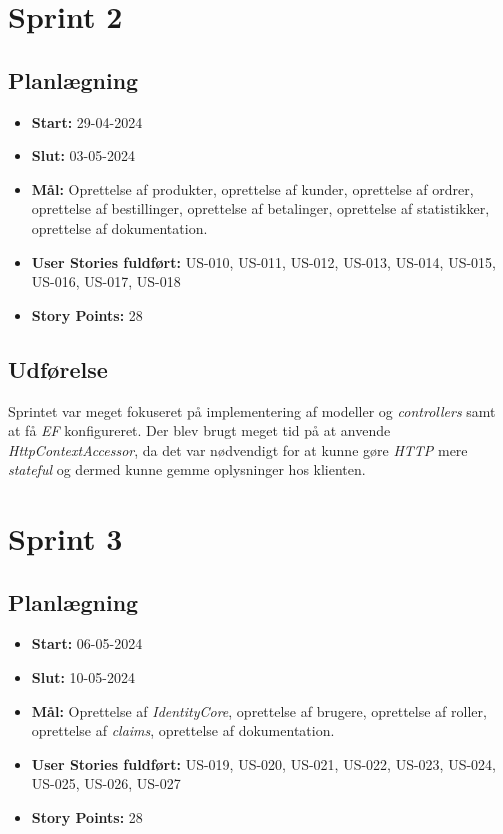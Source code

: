 \section{Sprint 2}
\label{sec:sprint-2}
\subsection{Planlægning}
\label{subsec:sprint-2-plan}
\begin{itemize}
    \item \textbf{Start:} 29-04-2024
    \item \textbf{Slut:} 03-05-2024
    \item \textbf{Mål:} Oprettelse af produkter, oprettelse af kunder, oprettelse af ordrer, oprettelse af bestillinger, oprettelse af betalinger, oprettelse af statistikker, oprettelse af dokumentation.
    \item \textbf{User Stories fuldført:} US-010, US-011, US-012, US-013, US-014, US-015, US-016, US-017, US-018
    \item \textbf{Story Points:} 28
\end{itemize}

\subsection{Udførelse}
\label{subsec:sprint-2-udforelse}
Sprintet var meget fokuseret på implementering af modeller og \emph{controllers} samt at få \emph{EF} konfigureret. 
Der blev brugt meget tid på at anvende \emph{HttpContextAccessor}, da det var nødvendigt for at kunne gøre \emph{HTTP} mere \emph{stateful} og dermed kunne gemme oplysninger hos klienten.

\section{Sprint 3}
\label{sec:sprint-3}
\subsection{Planlægning}
\label{subsec:sprint-3-plan}
\begin{itemize}
    \item \textbf{Start:} 06-05-2024
    \item \textbf{Slut:} 10-05-2024
    \item \textbf{Mål:} Oprettelse af \emph{IdentityCore}, oprettelse af brugere, oprettelse af roller, oprettelse af \emph{claims}, oprettelse af dokumentation.
    \item \textbf{User Stories fuldført:} US-019, US-020, US-021, US-022, US-023, US-024, US-025, US-026, US-027
    \item \textbf{Story Points:} 28
\end{itemize}

